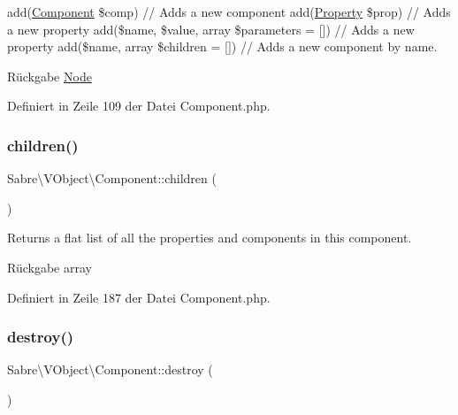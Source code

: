 add(\mbox{\hyperlink{class_sabre_1_1_v_object_1_1_component}{Component}} \$comp) // Adds a new component add(\mbox{\hyperlink{class_sabre_1_1_v_object_1_1_property}{Property}} \$prop) // Adds a new property add(\$name, \$value, array \$parameters = \mbox{[}\mbox{]}) // Adds a new property add(\$name, array \$children = \mbox{[}\mbox{]}) // Adds a new component by name.

\begin{DoxyReturn}{Rückgabe}
\mbox{\hyperlink{class_sabre_1_1_v_object_1_1_node}{Node}} 
\end{DoxyReturn}


Definiert in Zeile 109 der Datei Component.\+php.

\mbox{\label{class_sabre_1_1_v_object_1_1_component_a93c24cb817d101bf72ff065f64f8f2fd}} 
\subsubsection{\texorpdfstring{children()}{children()}}
{\footnotesize\ttfamily Sabre\textbackslash{}\+V\+Object\textbackslash{}\+Component\+::children (\begin{DoxyParamCaption}{ }\end{DoxyParamCaption})}

Returns a flat list of all the properties and components in this component.

\begin{DoxyReturn}{Rückgabe}
array 
\end{DoxyReturn}


Definiert in Zeile 187 der Datei Component.\+php.

\mbox{\label{class_sabre_1_1_v_object_1_1_component_ac086b0ad6f867f4ae03abf2919f9a131}} 
\subsubsection{\texorpdfstring{destroy()}{destroy()}}
{\footnotesize\ttfamily Sabre\textbackslash{}\+V\+Object\textbackslash{}\+Component\+::destroy (\begin{DoxyParamCaption}{ }\end{DoxyParamCaption})}

